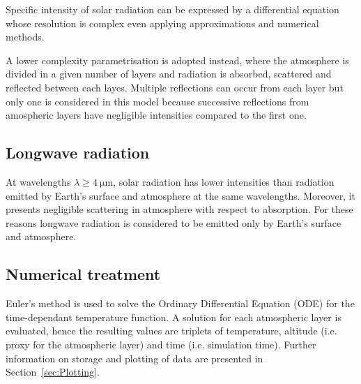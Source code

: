 \documentclass[a4paper,10pt,final,twocolumn]{article}
\begin{document}
Specific intensity of solar radiation can be expressed by a differential equation whose resolution is complex even applying approximations and numerical methods.\cite[469]{ramanathan}

A lower complexity parametrisation is adopted instead, where the atmosphere is divided in a given number of layers and radiation is absorbed, scattered and reflected between each layes. Multiple reflections can occur from each layer but only one is considered in this model because successive reflections from amospheric layers have negligible intensities compared to the first one.\cite[470]{ramanathan}




\subsection{Longwave radiation}
At wavelengths $\lambda \geq \qty{4}{\micro\metre}$, solar radiation has lower intensities than radiation emitted by Earth's surface and atmosphere at the same wavelengths. Moreover, it presents negligible scattering in atmosphere with respect to absorption. For these reasons longwave radiation is considered to be emitted only by Earth's surface and atmosphere.\cite[468]{ramanathan}




\subsection{Numerical treatment} %
\label{sec:Numerical treatment}

Euler's method is used to solve the Ordinary Differential Equation (ODE) for the time-dependant temperature function.\cite[472]{ramanathan} A solution for each atmospheric layer is evaluated, hence the resulting values are triplets of temperature, altitude (i.e. proxy for the atmospheric layer) and time (i.e. simulation time). Further information on storage and plotting of data are presented in Section~\ref{sec:Plotting}.
\end{document}
